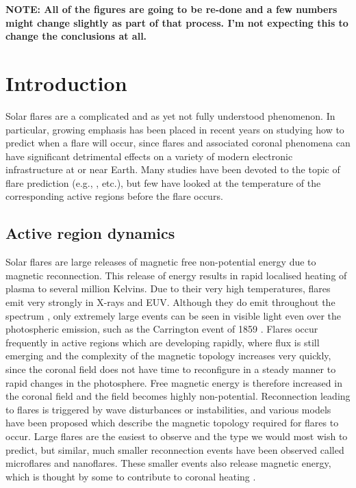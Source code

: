 \documentclass[namedreferences]{solarphysics}
\begin{document}
\begin{article}
\textbf{NOTE: All of the figures are going to be re-done and a few numbers might change slightly as part of that process. I'm not expecting this to change the conclusions at all.}

\section{Introduction}
\label{S-Introduction}

Solar flares are a complicated and as yet not fully understood phenomenon.
In particular, growing emphasis has been placed in recent years on studying how to predict when a flare will occur, since flares and associated coronal phenomena can have significant detrimental effects on a variety of modern electronic infrastructure at or near Earth.
Many studies have been devoted to the topic of flare prediction (e.g., \citet{Korsos2014,Ahmed2011,Bloomfield2012}, etc.), but few have looked at the temperature of the corresponding active regions before the flare occurs.

\subsection{Active region dynamics}
Solar flares are large releases of magnetic free non-potential energy due to magnetic reconnection. This release of energy results in rapid localised heating of plasma to several million Kelvins.
Due to their very high temperatures, flares emit very strongly in X-rays and EUV.
Although they do emit throughout the spectrum \citep{Fletcher2011}, only extremely large events can be seen in visible light even over the photospheric emission, such as the Carrington event of 1859 \citep{Carrington1859}.
Flares occur frequently in active regions which are developing rapidly, where flux is still emerging and the complexity of the magnetic topology increases very quickly, since the coronal field does not have time to reconfigure in a steady manner to rapid changes in the photosphere.
Free magnetic energy is therefore increased in the coronal field and the field becomes highly non-potential.
Reconnection leading to flares is triggered by wave disturbances or instabilities, and various models have been proposed which describe the magnetic topology required for flares to occur.
Large flares are the easiest to observe and the type we would most wish to predict, but similar, much smaller reconnection events have been observed called microflares and nanoflares.
These smaller events also release magnetic energy, which is thought by some to contribute to coronal heating .


\end{article}
\end{document}
